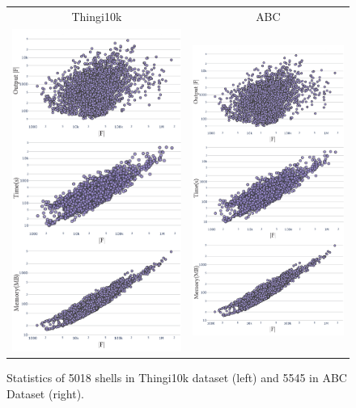 %     
\begin{figure}
    \centering
    \begin{tabular}{cc}
        Thingi10k & ABC \\ 
        \includegraphics[width=0.4\linewidth,page=2]{prism-tex/figs/stats_combined}
        &\includegraphics[width=0.4\linewidth,page=1]{prism-tex/figs/stats_combined}
    \end{tabular}
    \caption{Statistics of 5018 shells in Thingi10k dataset \cite{zhou2016thingi10k} (left) and 5545 in ABC Dataset \cite{koch2019abc} (right).}
    \label{prism:fig:large-dataset}
    
\end{figure}


